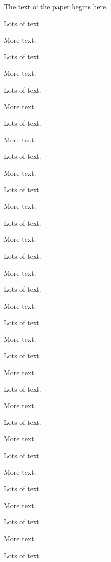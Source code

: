 \documentclass{sigplanconf}
\begin{document}

The text of the paper begins here.

Lots of text.

More text.

Lots of text.

More text.


Lots of text.

More text.

Lots of text.

More text.


Lots of text.

More text.

Lots of text.

More text.

Lots of text.

More text.

Lots of text.

More text.

Lots of text.

More text.

Lots of text.

More text.

Lots of text.

More text.

Lots of text.

More text.

Lots of text.

More text.

Lots of text.

More text.


Lots of text.

More text.

Lots of text.

More text.


Lots of text.
\end{document}
